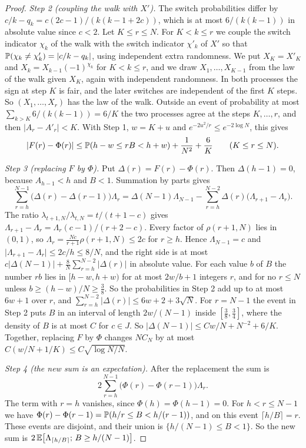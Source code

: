 \begin{proof}
\emph{Step 2 (coupling the walk with $X'$).} The switch probabilities differ
by $c/k-q_k=c(2c-1)/(k(k-1+2c))$, which is at most $6/(k(k-1))$ in absolute
value since $c<2$. Let $K\le r\le N$. For $K<k\le r$ we couple the switch
indicator $\chi_k$ of the walk with the switch indicator $\chi'_k$ of $X'$ so
that $\mathbb{P}(\chi_k\ne\chi'_k)=\lvert c/k-q_k\rvert$, using independent extra
randomness. We put $X_K=X'_K$ and $X_k=X_{k-1}(-1)^{\chi_k}$ for $K<k\le r$,
and we draw $X_1,\dots,X_{K-1}$ from the law of the walk given $X_K$, again
with independent randomness. In both processes the sign at step $K$ is fair,
and the later switches are independent of the first $K$ steps. So
$(X_1,\dots,X_r)$ has the law of the walk. Outside an event of probability at
most $\sum_{k>K}6/(k(k-1))=6/K$ the two processes agree at the steps
$K,\dots,r$, and then $\lvert A_r-A'_r\rvert<K$. With Step 1, $w=K+u$ and
$e^{-2u^2/r}\le e^{-2\log N}$, this gives
\[
\lvert F(r)-\Phi(r)\rvert\le\mathbb{P}(h-w\le rB<h+w)+\frac1{N^2}+\frac6K
\qquad(K\le r\le N).
\]

\emph{Step 3 (replacing $F$ by $\Phi$).} Put $\Delta(r)=F(r)-\Phi(r)$. Then
$\Delta(h-1)=0$, because $A_{h-1}<h$ and $B<1$. Summation by parts gives
\[
\sum_{r=h}^{N-1}\bigl(\Delta(r)-\Delta(r-1)\bigr)\Lambda_r
=\Delta(N-1)\Lambda_{N-1}-\sum_{r=h}^{N-2}\Delta(r)\bigl(\Lambda_{r+1}-\Lambda_r\bigr).
\]
The ratio $\lambda_{t+1,N}/\lambda_{t,N}=t/(t+1-c)$ gives
$\Lambda_{r+1}-\Lambda_r=\Lambda_r(c-1)/(r+2-c)$. Every factor of
$\rho(r+1,N)$ lies in $(0,1)$, so $\Lambda_r=\frac{Nc}{r+1}\rho(r+1,N)\le2c$
for $r\ge h$. Hence $\Lambda_{N-1}=c$ and
$\lvert\Lambda_{r+1}-\Lambda_r\rvert\le2c/h\le8/N$, and the right side is at
most $c\lvert\Delta(N-1)\rvert+\frac8N\sum_{r=h}^{N-2}\lvert\Delta(r)\rvert$
in absolute value. For each value $b$ of $B$ the number $rb$ lies in
$[h-w,h+w)$ for at most $2w/b+1$ integers $r$, and for no $r\le N$ unless
$b\ge(h-w)/N\ge\frac38$. So the probabilities in Step 2 add up to at most
$6w+1$ over $r$, and
$\sum_{r=h}^{N-2}\lvert\Delta(r)\rvert\le6w+2+3\sqrt N$. For $r=N-1$ the
event in Step 2 puts $B$ in an interval of length $2w/(N-1)$ inside
$[\frac38,\frac34]$, where the density of $B$ is at most $C$ for $c\in J$. So
$\lvert\Delta(N-1)\rvert\le Cw/N+N^{-2}+6/K$. Together, replacing $F$ by
$\Phi$ changes $NC_N$ by at most $C(w/N+1/K)\le C\sqrt{\log N/N}$.

\emph{Step 4 (the new sum is an expectation).} After the replacement the sum
is
\[
 2\sum_{r=h}^{N-1}\bigl(\Phi(r)-\Phi(r-1)\bigr)\Lambda_r .
\]
The term with $r=h$
vanishes, since $\Phi(h)=\Phi(h-1)=0$. For $h<r\le N-1$ we have
$\Phi(r)-\Phi(r-1)=\mathbb{P}(h/r\le B<h/(r-1))$, and on this event
$\lceil h/B\rceil=r$. These events are disjoint, and their union is
$\{h/(N-1)\le B<1\}$. So the new sum is
$2\,\mathbb{E}\bigl[\Lambda_{\lceil h/B\rceil};\,B\ge h/(N-1)\bigr]$.


\end{proof}
